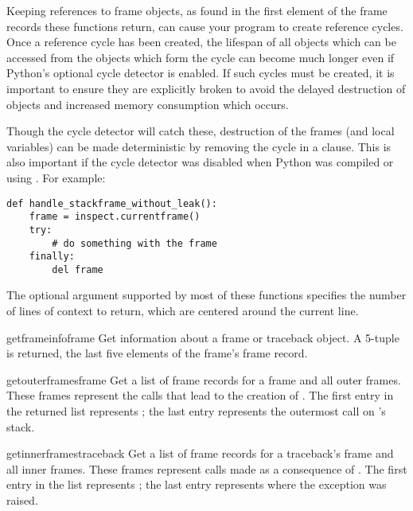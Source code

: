 \begin{notice}[warning]
Keeping references to frame objects, as found in
the first element of the frame records these functions return, can
cause your program to create reference cycles.  Once a reference cycle
has been created, the lifespan of all objects which can be accessed
from the objects which form the cycle can become much longer even if
Python's optional cycle detector is enabled.  If such cycles must be
created, it is important to ensure they are explicitly broken to avoid
the delayed destruction of objects and increased memory consumption
which occurs.

Though the cycle detector will catch these, destruction of the frames
(and local variables) can be made deterministic by removing the cycle
in a  clause.  This is also important if the cycle
detector was disabled when Python was compiled or using
.  For example:

\begin{verbatim}
def handle_stackframe_without_leak():
    frame = inspect.currentframe()
    try:
        # do something with the frame
    finally:
        del frame
\end{verbatim}
\end{notice}

The optional  argument supported by most of these
functions specifies the number of lines of context to return, which
are centered around the current line.

\begin{funcdesc}{getframeinfo}{frame}
  Get information about a frame or traceback object.  A 5-tuple
  is returned, the last five elements of the frame's frame record.
\end{funcdesc}

\begin{funcdesc}{getouterframes}{frame}
  Get a list of frame records for a frame and all outer frames.  These
  frames represent the calls that lead to the creation of .
  The first entry in the returned list represents ; the
  last entry represents the outermost call on 's stack.
\end{funcdesc}

\begin{funcdesc}{getinnerframes}{traceback}
  Get a list of frame records for a traceback's frame and all inner
  frames.  These frames represent calls made as a consequence of
  .  The first entry in the list represents
  ; the last entry represents where the exception was
  raised.
\end{funcdesc}


